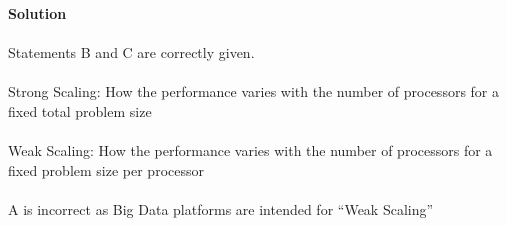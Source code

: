 \documentclass[prl,twocolumn,showpacs,preprintnumbers,superscriptaddress]{revtex4}
\theoremstyle{plain}
\theoremstyle{definition}
\begin{document}
\begin{widetext}
\textbf{Solution}
\\
\\
Statements B and C are correctly given.
\\
\\
Strong Scaling: How the performance varies with the number of processors for a fixed total problem size
\\
\\
Weak Scaling: How the performance varies with the number of processors for a fixed problem size per processor
\\
\\
A is incorrect as Big Data platforms are intended for “Weak Scaling”
\\
\\
\\
\end{widetext}
\end{document}
